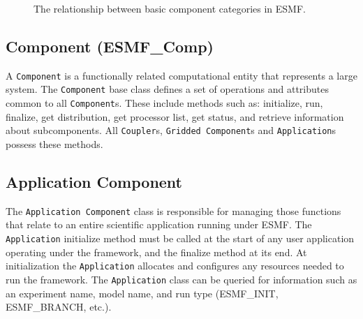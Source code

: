 \begin{figure}
\caption[{Component Classes}]{The relationship between basic component categories in ESMF.} 
\label{fig:ESMFComponentDiagram}
\end{figure}

\subsection{Component (ESMF\_Comp)} 
A {\tt Component} is a functionally related computational entity that 
represents a large system.  The {\tt Component} base class defines a set of operations and
attributes common to all {\tt Component}s.  These include methods such as:
initialize, run, finalize, get distribution, get processor list, get status, 
and retrieve information about subcomponents.  
All {\tt Coupler}s, {\tt Gridded Component}s and {\tt Application}s possess 
these methods. 

\subsection{Application Component }

The {\tt Application Component} class is responsible for managing those 
functions that relate to an entire scientific application running under ESMF.
The {\tt Application} initialize method 
must be called at the start of any user application operating under the framework, and
the finalize method at its end.  At initialization the {\tt Application} allocates and 
configures any resources needed to run the framework.  The {\tt Application}
class can be queried for information such as an experiment name, model name, and run 
type (ESMF\_INIT, ESMF\_BRANCH, etc.).  

